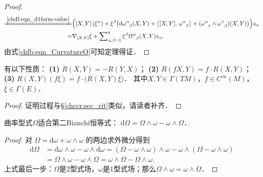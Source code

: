 \begin{proof}
\begin{align*}
   \xlongequal{\ref{chdf:eqn_d1form-value}}&\Bigl( \left[X,Y\right](\xi^\alpha)
   +\xi^\beta \bigl( \mathrm{d}\omega_{\hphantom{\alpha}\beta}^\alpha (X,Y)
   +\left< [X,Y],\, \omega_{\hphantom{\alpha}\beta}^\alpha\right> 
   + (\omega_{\hphantom{\alpha}\gamma}^\alpha \wedge \omega_{\hphantom{\alpha}\beta}^\gamma)(X,Y)
    \bigr)  \Bigr)s_\alpha  \\
   =&\nabla_{[X,Y]} \xi + \sum\nolimits_{\alpha,\beta=1}^{q} 
   \xi^\beta \Omega_{\hphantom{\alpha}\beta}^\alpha (X,Y) s_\alpha .
\end{align*} \setlength{\mathindent}{2em}
由式\eqref{chfb:eqn_CurvatureO}可知定理得证．
\end{proof}




\begin{theorem}\label{chfb:thm_RP}
    有以下性质：
    {\bfseries (1)} $R(X, Y)=-R(Y, X)$；
    {\bfseries (2)} $R(f X, Y)=f \cdot R(X, Y)$；
    {\bfseries (3)} $R(X, Y)(f \xi)=f \cdot\bigl(R(X, Y) \xi\bigr)$．
    其中$X, Y \in \Gamma(TM)$，$ f \in C^{\infty}(M)$，$ \xi \in \Gamma(E)$．
\end{theorem}
\begin{proof}
    证明过程与\S\ref{chccr:sec_rit}类似，请读者补齐．
\end{proof}


\begin{theorem}\label{chfb:thm_2ndBianchi}
    曲率型式$\Omega$适合第二Bianchi恒等式：
    $ \mathrm{d} \Omega = \Omega \wedge \omega - \omega \wedge \Omega $．
\end{theorem}
\begin{proof}
对 $\Omega=\mathrm{d} \omega + \omega \wedge \omega$ 的两边求外微分得到
\begin{align*}
    \mathrm{d} \Omega & =\mathrm{d} \omega \wedge \omega- \omega \wedge \mathrm{d} \omega 
     =(\Omega-\omega \wedge \omega) \wedge \omega-\omega \wedge(\Omega-\omega \wedge \omega) \\
    & =\Omega \wedge \omega-\omega \wedge \Omega =\omega \wedge \Omega-\Omega \wedge \omega  .
\end{align*}
上式最后一步：$\Omega$是2型式场，$\omega$是1型式场；那么$\Omega \wedge \omega=\omega \wedge \Omega$．
\end{proof}







